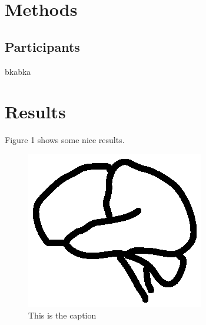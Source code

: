 \section{Methods}\label{methods}

\subsection{Participants}\label{participants}

bkabka

\section{Results}\label{results}

Figure 1 shows some nice results.

\begin{figure}[htbp]
\centering
\includegraphics{figures/figure1}
\caption{This is the caption}
\end{figure}
